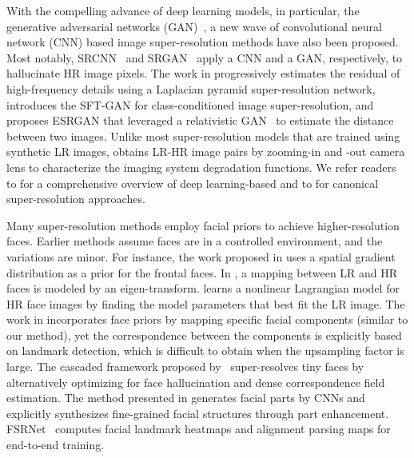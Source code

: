 \documentclass[10pt,twocolumn,letterpaper]{article}
\begin{document}
With the compelling advance of deep learning models, in particular, the generative adversarial networks (GAN)~\cite{goodfellow2014generative}, a new wave of convolutional neural network (CNN) based image super-resolution methods have also been proposed. Most notably, SRCNN~\cite{dong2015image} and SRGAN~\cite{ledig2017photo} apply a CNN and a GAN, respectively, to hallucinate HR image pixels. The work in \cite{lai2017deep} progressively estimates the residual of high-frequency details using a Laplacian pyramid super-resolution network, \cite{wang2018recovering} introduces the SFT-GAN for class-conditioned image super-resolution, and \cite{wang2018esrgan} proposes ESRGAN that leveraged a relativistic GAN~\cite{jolicoeur2018relativistic} to estimate the distance between two images. Unlike most super-resolution models that are trained using synthetic LR images, \cite{zhang2019zoom} obtains LR-HR image pairs by zooming-in and -out camera lens to characterize the imaging system degradation functions. We refer readers to \cite{yang2019deep} for a comprehensive overview of deep learning-based and to \cite{yang2014single} for canonical super-resolution approaches.

Many super-resolution methods employ facial priors to achieve higher-resolution faces. Earlier methods assume faces are in a controlled environment, and the variations are minor. For instance, the work proposed in \cite{baker2000hallucinating} uses a spatial gradient distribution as a prior for the frontal faces. In \cite{wang2005hallucinating}, a mapping between LR and HR faces is modeled by an eigen-transform. \cite{kolouri2015transport} learns a nonlinear Lagrangian model for HR face images by finding the model parameters that best fit the LR image. The work in \cite{yang2013structured} incorporates face priors by mapping specific facial components (similar to our method), yet the correspondence between the components is explicitly based on landmark detection, which is difficult to obtain when the upsampling factor is large. The cascaded framework proposed by~\cite{zhu2016deep} super-resolves tiny faces by alternatively optimizing for face hallucination and dense correspondence field estimation. The method presented in \cite{song2017learning} generates facial parts by CNNs and explicitly synthesizes fine-grained facial structures through part enhancement. FSRNet~\cite{FSRNet2018} computes facial landmark heatmaps and alignment parsing maps for end-to-end training.
\end{document}
